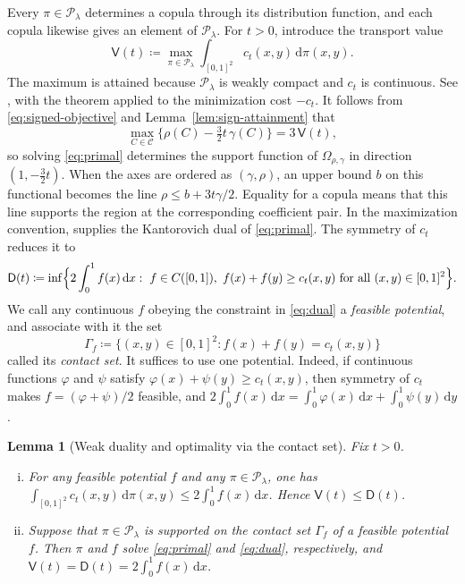 \documentclass{article}
\newtheorem{lemma}[theorem]{Lemma}
\theoremstyle{definition}
\theoremstyle{remark}
\newcommand{\1}{\mathds{1}}
\newcommand{\de}{\,\mathrm{d}}
\newcommand{\CC}{\mathcal{C}}
\newcommand{\couplings}{\mathcal{P}_\lambda}
\newcommand{\I}{[0,1]}
\newcommand{\Om}{\Omega_{\rho,\gamma}}
\begin{document}
Every $\pi\in\couplings$ determines a copula through its distribution function, and each copula likewise gives an element of $\couplings$.
For $t>0$, introduce the transport value
\begin{equation}\label{eq:primal}
\mathsf V(t)\coloneqq\max_{\pi\in\couplings}\int_{\I^2}c_t(x,y)\de\pi(x,y).
\end{equation}
The maximum is attained because $\couplings$ is weakly compact and $c_t$ is continuous. See \citet[Thm.~4.1 and its proof]{villani2009optimal}, with the theorem applied to the minimization cost $-c_t$.
It follows from \eqref{eq:signed-objective} and Lemma~\ref{lem:sign-attainment} that
\begin{equation}\label{eq:support-function}
	\max_{C\in\CC}\bigl\{\rho(C)-\tfrac32t\,\gamma(C)\bigr\}=3\,\mathsf V(t),
\end{equation}
so solving \eqref{eq:primal} determines the support function of $\Om$ in direction $(1,-\tfrac32t)$.
When the axes are ordered as $(\gamma,\rho)$, an upper bound $b$ on this functional becomes the line $\rho\le b+3t\gamma/2$.
Equality for a copula means that this line supports the region at the corresponding coefficient pair.
In the maximization convention, \citet[Thm.~5.10]{villani2009optimal} supplies the Kantorovich dual of \eqref{eq:primal}. The symmetry of $c_t$ reduces it to
\begin{equation}\label{eq:dual}
	\mathsf D(t)\coloneqq\inf\Bigl\{2\int_0^1f(x)\de x:\ f\in C(\I),\ f(x)+f(y)\ge c_t(x,y)\ \text{for all }(x,y)\in\I^2\Bigr\}.
\end{equation}
We call any continuous $f$ obeying the constraint in \eqref{eq:dual} a \emph{feasible potential}, and associate with it the set
\[
	\Gamma_f\coloneqq\bigl\{(x,y)\in\I^2:f(x)+f(y)=c_t(x,y)\bigr\}
\]
called its \emph{contact set}.
It suffices to use one potential. Indeed, if continuous functions $\varphi$ and $\psi$ satisfy $\varphi(x)+\psi(y)\ge c_t(x,y)$, then symmetry of $c_t$ makes $f=(\varphi+\psi)/2$ feasible, and $2\int_0^1f(x)\de x=\int_0^1\varphi(x)\de x+\int_0^1\psi(y)\de y$.

\begin{lemma}[Weak duality and optimality via the contact set]\label{lem:duality}
	Fix $t>0$.
	\begin{enumerate}[(i)]
		\item For any feasible potential $f$ and any $\pi\in\couplings$, one has $\int_{\I^2}c_t(x,y)\de\pi(x,y)\le2\int_0^1f(x)\de x$. Hence $\mathsf V(t)\le\mathsf D(t)$.
		\item Suppose that $\pi\in\couplings$ is supported on the contact set $\Gamma_f$ of a feasible potential $f$. Then $\pi$ and $f$ solve \eqref{eq:primal} and \eqref{eq:dual}, respectively, and $\mathsf V(t)=\mathsf D(t)=2\int_0^1f(x)\de x$.
	\end{enumerate}
\end{lemma}
\end{document}
